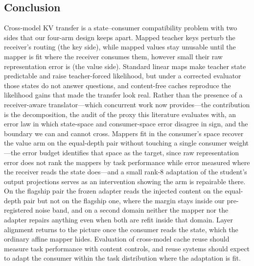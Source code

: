 \documentclass[11pt]{article}
\begin{document}
\subsection{Conclusion}
\label{sec:conclusion}
Cross-model KV transfer is a state--consumer compatibility problem with two sides
that our four-arm design keeps apart. Mapped teacher keys perturb the receiver's
routing (the key side), while mapped values stay unusable until the mapper is fit
where the receiver consumes them, however small their raw representation error is
(the value side). Standard linear maps make teacher state predictable and raise
teacher-forced likelihood, but under a corrected evaluator those states do not
answer questions, and content-free caches reproduce the likelihood gains that
made the transfer look real.
Rather than the presence of a receiver-aware translator---which concurrent work
now provides---the contribution is the decomposition, the audit of the proxy this
literature evaluates with, an error law in which state-space and consumer-space
error disagree in sign, and the boundary we can and cannot cross.
Mappers fit in the consumer's space recover the value
arm on the equal-depth pair without touching a single consumer weight---the error
budget identifies that space as the target, since raw representation error does not
rank the mappers by task performance while error measured where the receiver reads
the state does---and a small rank-8 adaptation of the student's output projections
serves as an intervention showing the arm is repairable there. On the flagship
pair the frozen
adapter reads the injected content on the equal-depth pair but not on the
flagship one, where the margin stays inside our pre-registered noise band, and on
a second domain neither the mapper nor the adapter repairs anything even when
both are refit inside that domain. Layer alignment returns to the picture once the
consumer reads the state, which the ordinary affine mapper hides. Evaluation of
cross-model cache reuse should measure task performance with content controls,
and reuse systems should expect to adapt the consumer within the task
distribution where the adaptation is fit.

\end{document}
